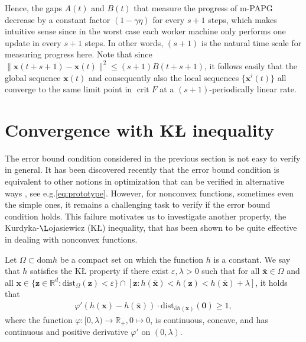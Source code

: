 \documentclass[leqno,onefignum,onetabnum]{siamart0516}
\newcommand{\eg}{{e.g.}\xspace}
\newcommand{\xb}{\mathbf{x}}
\newcommand{\zb}{\mathbf{z}}
\newcommand{\RR}{\mathds{R}}
\newcommand{\dist}{\mathrm{dist}}
\newcommand{\zero}{\mathbf{0}}
\newcommand{\crit}{\mathop{\mathrm{crit}}}
\newcommand{\KL}{K\L\xspace}
\newcommand{\mspg}{\textsf{m-PAPG}\xspace}
\begin{document}
Hence, the gaps $A(t)$ and $B(t)$ that measure the progress of \mspg decrease by a constant factor $(1-\gamma \eta)$ for every $s+1$ steps, which makes intuitive sense since in the worst case each worker machine only performs one update in every $s+1$ steps. In other words, $(s+1)$ is the natural time scale for measuring progress here. Note that since $\|\xb(t+s+1) - \xb(t)\|^2 \leq (s+1) B(t+s+1)$, it follows easily that the global sequence $\xb(t)$ and consequently also the local sequences $\{ \xb^i(t) \}$ all converge to the same limit point in $\crit F$ at a $(s+1)$-periodically linear rate.




\section{Convergence with \KL inequality}\label{sec: KL}
The error bound condition considered in the previous section is not easy to verify in general. It has been discovered recently that the error bound condition is equivalent to other notions in optimization that can be verified in alternative ways \cite{DrusvyatskiyLewis16,Zhang2016}, see \eg \eqref{eq:prototype}. However, for nonconvex functions, sometimes even the simple ones, it remains a challenging task to verify if the error bound condition holds. This failure motivates us to investigate another property, the Kurdyka-${\L}$ojasiewicz (\KL) inequality, that has been shown to be quite effective in dealing with nonconvex functions.

\begin{definition}[\KL property, {\cite[Lemma 6]{prox_alter_linear}}]\label{def:KL}
	Let $\Omega\subset \mathrm{dom} h$ be a compact set on which the function $h$ is a constant. We say that $h$ satisfies the \KL property if there exist $\varepsilon, \lambda >0$ such that for all $\bar{\xb} \in \Omega$ and all $\xb\in \{\zb\in \RR^d : \dist_\Omega(\zb)<\varepsilon\}\cap [\zb: h(\bar{\xb}) < h(\zb) <h(\bar{\xb}) + \lambda]$, it holds that
	\begin{align}\label{KLineq}
	\varphi'(h(\xb) - h(\bar{\xb})) \cdot \dist_{\partial h(\xb)}(\zero) \ge 1,
	\end{align}
	where the function $\varphi: [0,\lambda) \to \RR_+, 0\mapsto 0$, is continuous, concave, and has continuous and positive derivative $\varphi'$ on $(0,\lambda)$.
\end{definition}
\end{document}
